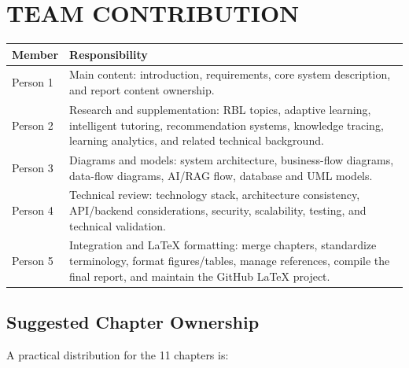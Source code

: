 \documentclass[12pt,a4paper]{report}
\begin{document}
\chapter*{TEAM CONTRIBUTION}

\begin{longtable}{p{}p{}}
\toprule
\textbf{Member} & \textbf{Responsibility}\\
\midrule
Person 1 & Main content: introduction, requirements, core system description, and report content ownership.\\
Person 2 & Research and supplementation: RBL topics, adaptive learning, intelligent tutoring, recommendation systems, knowledge tracing, learning analytics, and related technical background.\\
Person 3 & Diagrams and models: system architecture, business-flow diagrams, data-flow diagrams, AI/RAG flow, database and UML models.\\
Person 4 & Technical review: technology stack, architecture consistency, API/backend considerations, security, scalability, testing, and technical validation.\\
Person 5 & Integration and LaTeX formatting: merge chapters, standardize terminology, format figures/tables, manage references, compile the final report, and maintain the GitHub LaTeX project.\\
\bottomrule
\end{longtable}

\section*{Suggested Chapter Ownership}

A practical distribution for the 11 chapters is:
\end{document}
